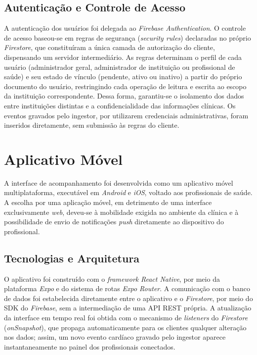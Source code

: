 \subsection{Autenticação e Controle de Acesso}
\label{sec:seguranca}

A autenticação dos usuários foi delegada ao \textit{Firebase Authentication}. O controle de acesso baseou-se em regras de segurança (\textit{security rules}) declaradas no próprio \textit{Firestore}, que constituíram a única camada de autorização do cliente, dispensando um servidor intermediário. As regras determinam o perfil de cada usuário (administrador geral, administrador de instituição ou profissional de saúde) e seu estado de vínculo (pendente, ativo ou inativo) a partir do próprio documento do usuário, restringindo cada operação de leitura e escrita ao escopo da instituição correspondente. Dessa forma, garantiu-se o isolamento dos dados entre instituições distintas e a confidencialidade das informações clínicas. Os eventos gravados pelo ingestor, por utilizarem credenciais administrativas, foram inseridos diretamente, sem submissão às regras do cliente.


\section{Aplicativo Móvel}
\label{sec:app}

A interface de acompanhamento foi desenvolvida como um aplicativo móvel multiplataforma, executável em \textit{Android} e \textit{iOS}, voltado aos profissionais de saúde. A escolha por uma aplicação móvel, em detrimento de uma interface exclusivamente \textit{web}, deveu-se à mobilidade exigida no ambiente da clínica e à possibilidade de envio de notificações \textit{push} diretamente ao dispositivo do profissional.

\subsection{Tecnologias e Arquitetura}
\label{sec:appArq}

O aplicativo foi construído com o \textit{framework} \textit{React Native}, por meio da plataforma \textit{Expo} e do sistema de rotas \textit{Expo Router}. A comunicação com o banco de dados foi estabelecida diretamente entre o aplicativo e o \textit{Firestore}, por meio do \acs{SDK} do \textit{Firebase}, sem a intermediação de uma \acs{API} \acs{REST} própria. A atualização da interface em tempo real foi obtida com o mecanismo de \textit{listeners} do \textit{Firestore} (\textit{onSnapshot}), que propaga automaticamente para os clientes qualquer alteração nos dados; assim, um novo evento cardíaco gravado pelo ingestor aparece instantaneamente no painel dos profissionais conectados.

